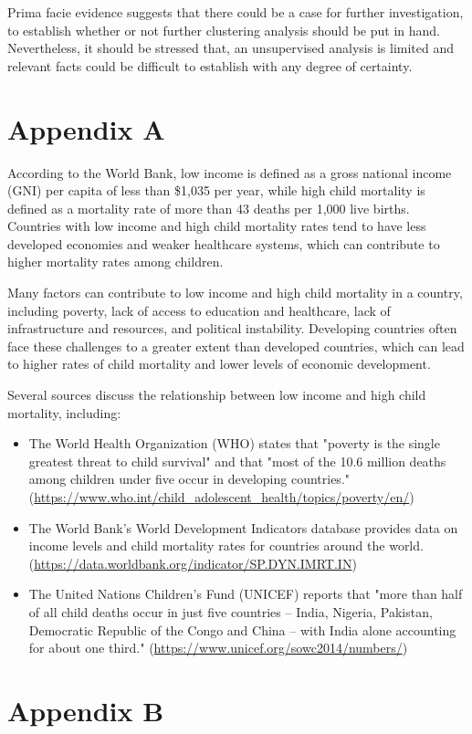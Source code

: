 \documentclass[
  course = {{DS12E Clustering Algorithms}},
  quartile = {{2}},
  assignment = 2,
  name = {{Michael Darmanis ; Vasilios Venieris}},
  studentnumber = {{7115152200004 ; 7115152200017}},
  email = {{mdarm@di.uoa.gr ; vvenieris@di.uoa.gr}},
  firstexercise = 1
]{aga-homework}
\begin{document}
Prima facie evidence suggests that there could be a case for further investigation, to establish whether or not further clustering analysis should be put in hand. Nevertheless, it should be stressed that, an unsupervised analysis is limited and relevant facts could be difficult to establish with any degree of certainty.

\printbibliography

\section*{Appendix A}

According to the World Bank, low income is defined as a gross national income (GNI) per capita of less than \$1,035 per year, while high child mortality is defined as a mortality rate of more than 43 deaths per 1,000 live births. Countries with low income and high child mortality rates tend to have less developed economies and weaker healthcare systems, which can contribute to higher mortality rates among children.

Many factors can contribute to low income and high child mortality in a country, including poverty, lack of access to education and healthcare, lack of infrastructure and resources, and political instability. Developing countries often face these challenges to a greater extent than developed countries, which can lead to higher rates of child mortality and lower levels of economic development.

Several sources discuss the relationship between low income and high child mortality, including:
\begin{itemize}
\item The World Health Organization (WHO) states that "poverty is the single greatest threat to child survival" and that "most of the 10.6 million deaths among children under five occur in developing countries." (\url{https://www.who.int/child_adolescent_health/topics/poverty/en/})
\item The World Bank's World Development Indicators database provides data on income levels and child mortality rates for countries around the world. (\url{https://data.worldbank.org/indicator/SP.DYN.IMRT.IN})
\item The United Nations Children's Fund (UNICEF) reports that "more than half of all child deaths occur in just five countries – India, Nigeria, Pakistan, Democratic Republic of the Congo and China – with India alone accounting for about one third." (\url{https://www.unicef.org/sowc2014/numbers/})
\end{itemize} 

\section*{Appendix B}




\end{document}
